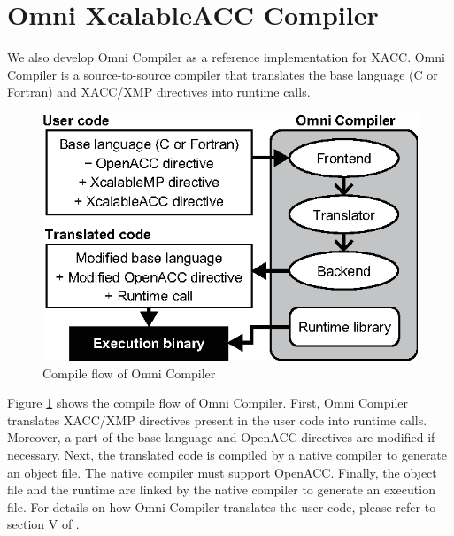 \section{Omni XcalableACC Compiler}
We also develop Omni Compiler as a reference implementation for XACC.
Omni Compiler is a source-to-source compiler that translates the base language (C or Fortran) and XACC/XMP directives into runtime calls.

\begin{figure}[!t]
\centering
\includegraphics[scale=0.94,clip]{figs/flow2.eps}
\caption{Compile flow of Omni Compiler}
\label{fig:flow}
\end{figure}

Figure \ref{fig:flow} shows the compile flow of Omni Compiler.
First, 
Omni Compiler translates XACC/XMP directives present in the user code into runtime calls. 
Moreover, a part of the base language and OpenACC directives are modified if necessary.
Next, the translated code is compiled by a native compiler to generate an object file.
The native compiler must support OpenACC.
Finally, the object file and the runtime are linked by the native compiler to generate an execution file.
For details on how Omni Compiler translates the user code, please refer to section V of \cite{nakao2014}.

